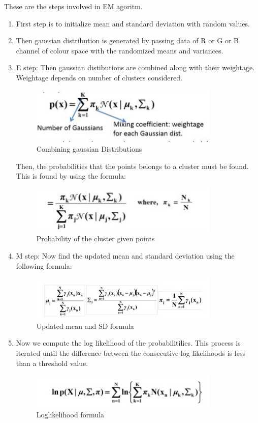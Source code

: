 \documentclass[12pt]{article}
\begin{document}
These are the steps involved in EM agoritm.
\begin{enumerate}
\item First step is to initialize mean and standard deviation with random values.
\item Then gaussian distribution is generated by passing data of R or G or B channel of colour space with the  randomized means and variances. 
\item E step: Then gaussian distibutions are combined along with their weightage. Weightage depends on number of clusters considered.
\begin{figure}[h]
    \centering
    \includegraphics[width=9cm]{Estep}
    \caption{Combining gaussian Distributions}
    \label{fig:Combining gaussian Distributions}
\end{figure}
Then, the probabilities that the points belongs to a cluster must be found. This is found by using the formula:
\begin{figure}[h]
    \centering
    \includegraphics[width=9cm]{Pcx}
    \caption{Probability of the cluster given points}
    \label{fig:Probability of the cluster given points}
\end{figure}
\item M step: Now find the updated mean and standard deviation using the following formula:
\begin{figure}[h]
    \centering
    \includegraphics[width=9cm]{msd}
    \caption{Updated mean and SD formula}
    \label{fig:Updated mean and SD formula}
\end{figure}

\item Now we compute the log likelihood of the probabilitilies. This process is iterated until the difference between the consecutive log likelihoods is less than a threshold value.
\newpage
\begin{figure}[h]
    \centering
    \includegraphics[width=9cm]{logl}
    \caption{Loglikelihood formula}
    \label{fig:Loglikelihood formula}
\end{figure}
\end{enumerate}
\end{document}
